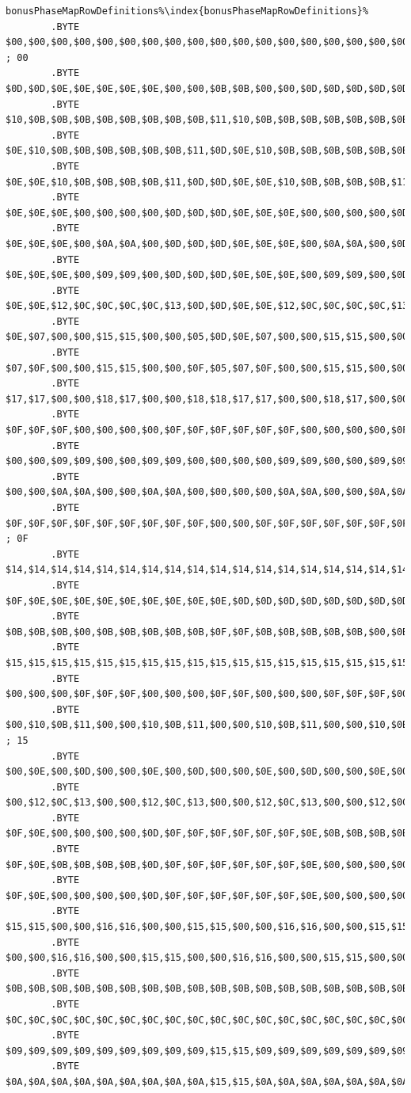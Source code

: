 \begin{lstlisting}[basicstyle=\tiny,escapechar=\%]
bonusPhaseMapRowDefinitions%\index{bonusPhaseMapRowDefinitions}%   
        .BYTE $00,$00,$00,$00,$00,$00,$00,$00,$00,$00,$00,$00,$00,$00,$00,$00,$00,$00,$00,$00 ; 00
        .BYTE $0D,$0D,$0E,$0E,$0E,$0E,$0E,$00,$00,$0B,$0B,$00,$00,$0D,$0D,$0D,$0D,$0D,$0E,$0E 
        .BYTE $10,$0B,$0B,$0B,$0B,$0B,$0B,$0B,$0B,$11,$10,$0B,$0B,$0B,$0B,$0B,$0B,$0B,$0B,$11
        .BYTE $0E,$10,$0B,$0B,$0B,$0B,$0B,$0B,$11,$0D,$0E,$10,$0B,$0B,$0B,$0B,$0B,$0B,$11,$0D
        .BYTE $0E,$0E,$10,$0B,$0B,$0B,$0B,$11,$0D,$0D,$0E,$0E,$10,$0B,$0B,$0B,$0B,$11,$0D,$0D
        .BYTE $0E,$0E,$0E,$00,$00,$00,$00,$0D,$0D,$0D,$0E,$0E,$0E,$00,$00,$00,$00,$0D,$0D,$0D
        .BYTE $0E,$0E,$0E,$00,$0A,$0A,$00,$0D,$0D,$0D,$0E,$0E,$0E,$00,$0A,$0A,$00,$0D,$0D,$0D
        .BYTE $0E,$0E,$0E,$00,$09,$09,$00,$0D,$0D,$0D,$0E,$0E,$0E,$00,$09,$09,$00,$0D,$0D,$0D
        .BYTE $0E,$0E,$12,$0C,$0C,$0C,$0C,$13,$0D,$0D,$0E,$0E,$12,$0C,$0C,$0C,$0C,$13,$0D,$0D
        .BYTE $0E,$07,$00,$00,$15,$15,$00,$00,$05,$0D,$0E,$07,$00,$00,$15,$15,$00,$00,$05,$0D
        .BYTE $07,$0F,$00,$00,$15,$15,$00,$00,$0F,$05,$07,$0F,$00,$00,$15,$15,$00,$00,$0F,$05
        .BYTE $17,$17,$00,$00,$18,$17,$00,$00,$18,$18,$17,$17,$00,$00,$18,$17,$00,$00,$18,$18
        .BYTE $0F,$0F,$0F,$00,$00,$00,$00,$0F,$0F,$0F,$0F,$0F,$0F,$00,$00,$00,$00,$0F,$0F,$0F
        .BYTE $00,$00,$09,$09,$00,$00,$09,$09,$00,$00,$00,$00,$09,$09,$00,$00,$09,$09,$00,$00
        .BYTE $00,$00,$0A,$0A,$00,$00,$0A,$0A,$00,$00,$00,$00,$0A,$0A,$00,$00,$0A,$0A,$00,$00
        .BYTE $0F,$0F,$0F,$0F,$0F,$0F,$0F,$0F,$0F,$00,$00,$0F,$0F,$0F,$0F,$0F,$0F,$0F,$0F,$0F ; 0F
        .BYTE $14,$14,$14,$14,$14,$14,$14,$14,$14,$14,$14,$14,$14,$14,$14,$14,$14,$14,$14,$14
        .BYTE $0F,$0E,$0E,$0E,$0E,$0E,$0E,$0E,$0E,$0E,$0D,$0D,$0D,$0D,$0D,$0D,$0D,$0D,$0D,$0F
        .BYTE $0B,$0B,$0B,$00,$0B,$0B,$0B,$0B,$0B,$0F,$0F,$0B,$0B,$0B,$0B,$0B,$00,$0B,$0B,$0B
        .BYTE $15,$15,$15,$15,$15,$15,$15,$15,$15,$15,$15,$15,$15,$15,$15,$15,$15,$15,$15,$15
        .BYTE $00,$00,$00,$0F,$0F,$0F,$00,$00,$00,$0F,$0F,$00,$00,$00,$0F,$0F,$0F,$00,$00,$00
        .BYTE $00,$10,$0B,$11,$00,$00,$10,$0B,$11,$00,$00,$10,$0B,$11,$00,$00,$10,$0B,$11,$00 ; 15 
        .BYTE $00,$0E,$00,$0D,$00,$00,$0E,$00,$0D,$00,$00,$0E,$00,$0D,$00,$00,$0E,$00,$0D,$00
        .BYTE $00,$12,$0C,$13,$00,$00,$12,$0C,$13,$00,$00,$12,$0C,$13,$00,$00,$12,$0C,$13,$00
        .BYTE $0F,$0E,$00,$00,$00,$00,$0D,$0F,$0F,$0F,$0F,$0F,$0F,$0E,$0B,$0B,$0B,$0B,$0D,$0F
        .BYTE $0F,$0E,$0B,$0B,$0B,$0B,$0D,$0F,$0F,$0F,$0F,$0F,$0F,$0E,$00,$00,$00,$00,$0D,$0F
        .BYTE $0F,$0E,$00,$00,$00,$00,$0D,$0F,$0F,$0F,$0F,$0F,$0F,$0E,$00,$00,$00,$00,$0D,$0F
        .BYTE $15,$15,$00,$00,$16,$16,$00,$00,$15,$15,$00,$00,$16,$16,$00,$00,$15,$15,$00,$00
        .BYTE $00,$00,$16,$16,$00,$00,$15,$15,$00,$00,$16,$16,$00,$00,$15,$15,$00,$00,$16,$16
        .BYTE $0B,$0B,$0B,$0B,$0B,$0B,$0B,$0B,$0B,$0B,$0B,$0B,$0B,$0B,$0B,$0B,$0B,$0B,$0B,$0B
        .BYTE $0C,$0C,$0C,$0C,$0C,$0C,$0C,$0C,$0C,$0C,$0C,$0C,$0C,$0C,$0C,$0C,$0C,$0C,$0C,$0C
        .BYTE $09,$09,$09,$09,$09,$09,$09,$09,$09,$15,$15,$09,$09,$09,$09,$09,$09,$09,$09,$09
        .BYTE $0A,$0A,$0A,$0A,$0A,$0A,$0A,$0A,$0A,$15,$15,$0A,$0A,$0A,$0A,$0A,$0A,$0A,$0A,$0A
\end{lstlisting}


